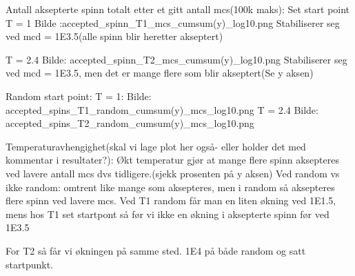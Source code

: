 \documentclass[../main.tex]{subfiles}
\begin{document}





Antall aksepterte spinn totalt etter et gitt antall mcs(100k maks):
Set start point
T = 1
Bilde :accepted_spinn_T1_mcs_cumsum(y)_log10.png
Stabiliserer seg ved mcd = 1E3.5(alle spinn blir heretter akseptert)

T = 2.4
Bilde: accepted_spinn_T2_mcs_cumsum(y)_log10.png
Stabiliserer seg ved mcd = 1E3.5, men det er mange flere som blir akseptert(Se y aksen)



Random start point:
T = 1:
Bilde: accepted_spins_T1_random_cumsum(y)_mcs_log10.png
T = 2.4
Bilde: accepted_spins_T2_random_cumsum(y)_mcs_log10.png

Temperaturavhengighet(skal vi lage plot her også- eller holder det med kommentar i resultater?):
Økt temperatur gjør at mange flere spinn aksepteres ved lavere antall mcs dvs tidligere.(sjekk prosenten på y aksen)
Ved random vs ikke random: omtrent like mange som aksepteres, men i random så aksepteres flere spinn ved lavere mcs. Ved T1 random får man en liten økning ved 1E1.5, mens hos T1 set startpont så før vi ikke en økning i aksepterte spinn før ved 1E3.5

For T2 så får vi økningen på samme sted. 1E4 på både random og satt startpunkt.

\end{document}
